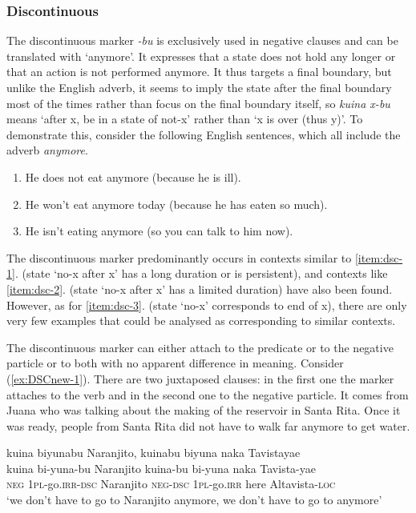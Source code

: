 \subsubsection{Discontinuous}\label{sec:Discontinuous}
The discontinuous marker \textit{-bu} is exclusively used in negative clauses and can be translated with ‘anymore’. It expresses that a state does not hold any longer or that an action is not performed anymore. It thus targets a final boundary, but unlike the English adverb, it seems to imply the state after the final boundary most of the times rather than focus on the final boundary itself, so \textit{kuina x-bu} means ‘after x, be in a state of not-x’ rather than ‘x is over (thus y)’. To demonstrate this, consider the following English sentences, which all include the adverb \textit{anymore}.

\begin{enumerate}
\item He does not eat anymore (because he is ill).\label{item:dsc-1}
\item He won’t eat anymore today (because he has eaten so much).\label{item:dsc-2}
\item He  isn’t eating anymore (so you can talk to him now).\label{item:dsc-3}
\end{enumerate}

The discontinuous marker predominantly occurs in contexts similar to \ref{item:dsc-1}. (state ‘no-x after x’ has a long duration or is persistent), and contexts like \ref{item:dsc-2}. (state ‘no-x after x’ has a limited duration) have also been found. However, as for \ref{item:dsc-3}. (state ‘no-x’ corresponds to end of x), there are only very few examples that could be analysed as corresponding to similar contexts. 
 
The discontinuous marker can either attach to the predicate or to the negative particle or to both with no apparent difference in meaning. Consider (\ref{ex:DSCnew-1}). There are two juxtaposed clauses: in the first one the marker attaches to the verb and in the second one to the negative particle. It comes from Juana who was talking about the making of the reservoir in Santa Rita. Once it was ready, people from Santa Rita did not have to walk far anymore to get water.

\ea\label{ex:DSCnew-1}
\begingl
\glpreamble kuina biyunabu Naranjito, kuinabu biyuna naka Tavistayae\\
\gla kuina bi-yuna-bu Naranjito kuina-bu bi-yuna naka Tavista-yae\\
\glb \textsc{neg} 1\textsc{pl}-go.\textsc{irr}-\textsc{dsc} Naranjito \textsc{neg}-\textsc{dsc} 1\textsc{pl}-go.\textsc{irr} here Altavista-\textsc{loc}\\
\glft ‘we don’t have to go to Naranjito anymore, we don’t have to go to  anymore’
\endgl
\trailingcitation{[jxx-p120515l-2.207-208]}
\xe

